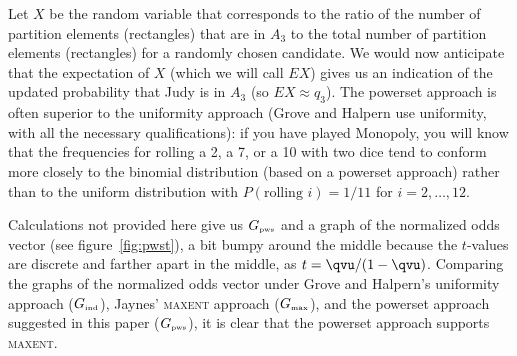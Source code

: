 \documentclass[11pt]{article}
\begin{document}
Let $X$ be the random variable that corresponds to the ratio of the
number of partition elements (rectangles) that are in $A_{3}$ to the
total number of partition elements (rectangles) for a randomly chosen
candidate. We would now anticipate that the expectation of $X$ (which
we will call $EX$) gives us an indication of the updated probability
that Judy is in $A_{3}$ (so $EX\approx{}q_{3}$). The powerset approach
is often superior to the uniformity approach (Grove and Halpern use
uniformity, with all the necessary qualifications): if you have played
Monopoly, you will know that the frequencies for rolling a 2, a 7, or
a 10 with two dice tend to conform more closely to the binomial
distribution (based on a powerset approach) rather than to the uniform
distribution with $P(\mbox{rolling }i)=1/11$ for $i=2,{\ldots},12$.


Calculations not provided here give us $G_{\mbox{\tiny pws}}$ and a
graph of the normalized odds vector (see figure~\ref{fig:pwst}), a bit
bumpy around the middle because the $t$-values are discrete and
farther apart in the middle, as $t={\qvu}/(1-{\qvu})$. Comparing the graphs of
the normalized odds vector under Grove and Halpern's uniformity
approach ($G_{\mbox{\tiny ind}}$), Jaynes' \textsc{maxent} approach
($G_{\mbox{\tiny max}}$), and the powerset approach suggested in this
paper ($G_{\mbox{\tiny pws}}$), it is clear that the powerset approach
supports \textsc{maxent}.
\end{document}
